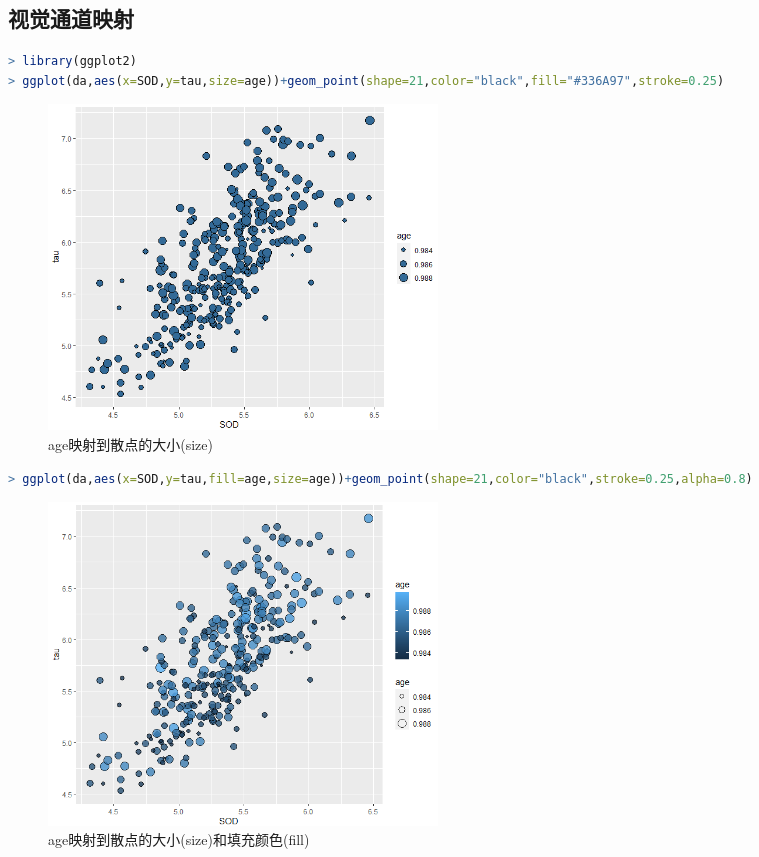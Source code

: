 \documentclass[11pt,a4paper,oneside]{book}
\begin{document}
\subsection{视觉通道映射}
\begin{multicols}{2} 
\begin{lstlisting}[language=r]
> library(ggplot2)
> ggplot(da,aes(x=SOD,y=tau,size=age))+geom_point(shape=21,color="black",fill="#336A97",stroke=0.25)
\end{lstlisting}
\begin{figure}[H]
	\centering
	\includegraphics[width=0.5\textwidth]{screenshot018}
	\caption{age映射到散点的大小(size)}
	\label{fig:screenshot018}
\end{figure}
\end{multicols}
\begin{multicols}{2} 
\begin{lstlisting}[language=r]
> ggplot(da,aes(x=SOD,y=tau,fill=age,size=age))+geom_point(shape=21,color="black",stroke=0.25,alpha=0.8)
\end{lstlisting}
\begin{figure}[H]
	\centering
	\includegraphics[width=0.5\textwidth]{screenshot017}
	\caption{age映射到散点的大小(size)和填充颜色(fill)}
	\label{fig:screenshot017}
\end{figure}
\end{multicols}
\end{document}
